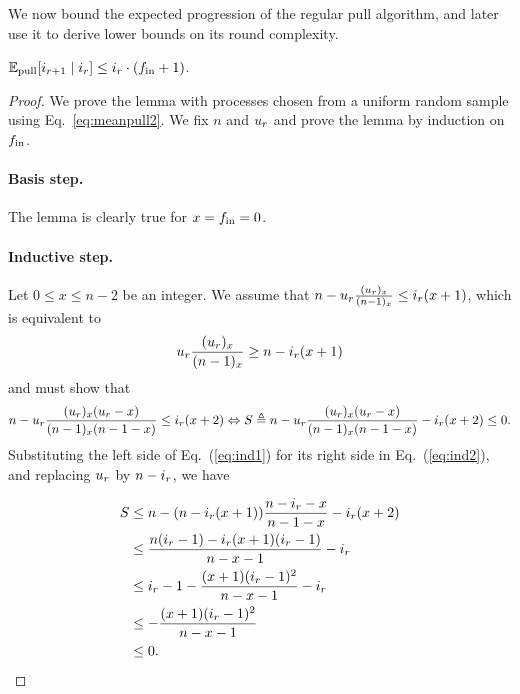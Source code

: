  We now bound the expected progression of the regular pull algorithm, and later use it to derive lower bounds on its round complexity.
 
 \begin{lemma}
   \label{lem:pullasymptotic}
$\mathbb{E}_\text{pull}[i_{r+1}\mid i_{r}] \leq i_{r} \cdot(f_\text{in}+1)$.
 \end{lemma}

\begin{proof}
  We prove the lemma with processes chosen from a uniform random sample using Eq.~\eqref{eq:meanpull2}. We fix $n$ and $u_{r}$ and prove the lemma by induction on $f_\text{in}$.

  \paragraph{Basis step.} The lemma is clearly true for $x=f_\text{in}=0$.
  \paragraph{Inductive step.} Let $0 \leq x \leq n-2$ be an integer. We assume that $n-u_{r} \frac{(u_{r})_x}{(n-1)_x} \leq i_{r}(x+1)$, which is equivalent to
  \begin{align}
    \label{eq:ind1}
     u_{r} \frac{(u_{r})_x}{(n-1)_x} \geq n - i_{r}(x+1)
  \end{align}
  and must show that
  \begin{align}
    \label{eq:ind2}
    n-u_{r} \frac{(u_{r})_x(u_{r}-x)}{(n-1)_x(n-1-x)} \leq i_{r}(x+2) \Leftrightarrow  S \triangleq n-u_{r} \frac{(u_{r})_x(u_{r}-x)}{(n-1)_x(n-1-x)} - i_{r}(x+2) \leq 0.
     \end{align}
Substituting the left side of Eq.~(\ref{eq:ind1}) for its right side in Eq.~(\ref{eq:ind2}), and replacing $u_{r}$ by $n - i_{r}$, we have

\begin{equation}
  \begin{split}
  S & \leq n- (n - i_{r}(x+1)) \frac{n-i_{r}-x}{n-1-x} - i_{r}(x+2) \\
    & \leq \frac{n(i_{r}-1) - i_{r} (x+1) (i_{r}  - 1)}{n-x-1} - i_{r} \\ & \leq i_{r}-1 - \frac{(x+1) (i_{r}  - 1)^2}{n-x-1} - i_{r} \\
    & \leq - \frac{(x+1) (i_{r}  - 1)^2}{n-x-1} \\
  & \leq 0.
  \end{split}
\end{equation}
  
 \end{proof}


